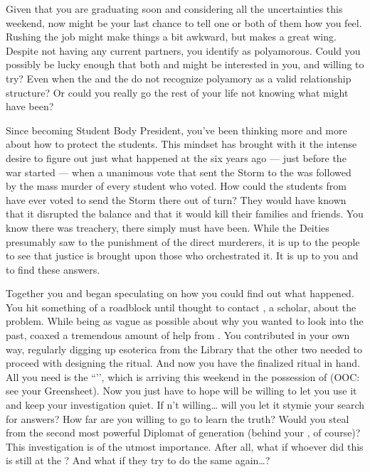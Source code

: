 \documentclass[char]{GL2020}
\begin{document}
Given that you are graduating soon and considering all the uncertainties this weekend, now might be your last chance to tell one or both of them how you feel. Rushing the job might make things a bit awkward, but \cInitiate{} makes a great wing\cInitiate{\person}. Despite not having any current partners, you identify as polyamorous. Could you possibly be lucky enough that both \cHeir{} and \cChupStudent{} might be interested in you, and willing to try? Even when the \pFarm{} and the \pTech{} do not recognize polyamory as a valid relationship structure? Or could you really go the rest of your life not knowing what might have been?

Since becoming Student Body President, you've been thinking more and more about how to protect the students. This mindset has brought with it the intense desire to figure out just what happened at the \pSc{} six years ago — just before the war started — when a unanimous vote that sent the Storm to the \pShip{} was followed by the mass murder of every student who voted. How could the students from \pShip{} have ever voted to send the Storm there out of turn? They would have known that it disrupted the balance and that it would kill their families and friends. You know there was treachery, there simply must have been. While the Deities presumably saw to the punishment of the direct murderers, it is up to the people to see that justice is brought upon those who orchestrated it. It is up to you and \cHeir{} to find these answers. 

Together you and \cHeir{} began speculating on how you could find out what happened. You hit something of a roadblock until \cHeir{} thought to contact \cWildCard{\full}, a \pFarm{} scholar, about the problem. While being as vague as possible about why you wanted to look into the past, \cHeir{} coaxed a tremendous amount of help from \cWildCard{\them}. You contributed in your own way, regularly digging up esoterica from the Library that the other two needed to proceed with designing the ritual. And now you have the finalized ritual in hand. All you need is the ``\iMirror{}’’, which is arriving this weekend in the possession of \cDiplomat{\full} (OOC: see your Greensheet). Now you just have to hope \cDiplomat{\they} will be willing to let you use it and keep your investigation quiet. If \cDiplomat{\theyare}n't willing\ldots{} will you let it stymie your search for answers? How far are you willing to go to learn the truth? Would you steal from the second most powerful Diplomat of \cDiplomat{\their} generation (behind your \cHeadDiplomat{\Auncle} \cHeadDiplomat{\full}, of course)? This investigation is of the utmost importance. After all, what if whoever did this is still at the \pSchool{}? And what if they try to do the same again\ldots{}?
\end{document}
